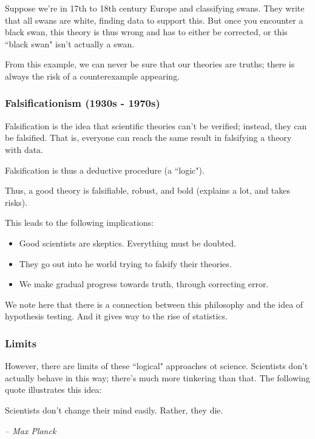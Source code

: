 \documentclass[openany]{book}
\begin{document}
\begin{example}
	Suppose we're in 17th to 18th century Europe and classifying swans. They write that all swans are white, finding data to support this. But once you encounter a black swan, this theory is thus wrong and has to either be corrected, or this ``black swan" isn't actually a swan.
\end{example}

From this example, we can never be sure that our theories are truths; there is always the risk of a counterexample appearing.

\subsubsection{Falsificationism (1930s - 1970s)}
\begin{defn}
	Falsification is the idea that scientific theories can't be verified; instead, they can be falsified. That is, everyone can reach the same result in falsifying a theory with data.
\end{defn}

Falsification is thus a deductive procedure (a ``logic").

Thus, a good theory is falsifiable, robust, and bold (explains a lot, and takes risks).

This leads to the following implications:
\begin{itemize}
	\item Good scientists are skeptics. Everything must be doubted.
	\item They go out into he world trying to falsify their theories.
	\item We make gradual progress towards truth, through correcting error.
\end{itemize}

\begin{rmk}
	We note here that there is a connection between this philosophy and the idea of hypothesis testing. And it gives way to the rise of statistics.
\end{rmk}

\subsubsection{Limits}
However, there are limits of these ``logical" approaches ot science. Scientists don't actually behave in this way; there's much more tinkering than that. The following quote illustrates this idea:

\begin{fancyquotes}
	Scientists don't change their mind easily. Rather, they die.
	
	\begin{flushright}
		\emph{\textit{-- Max Planck}}
	\end{flushright}
\end{fancyquotes}
\end{document}
